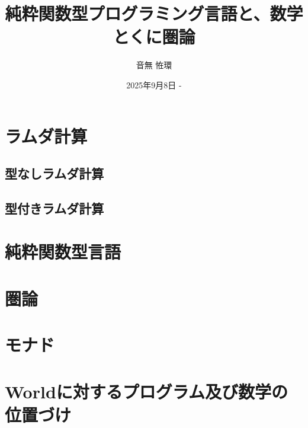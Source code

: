 \documentclass[uplatex,dvipdfmx,a4paper]{jsbook}
\title{純粋関数型プログラミング言語と、数学とくに圏論}
\author{音無 恠環}
\date{2025年9月8日 - }
\begin{document}
    \maketitle

    \chapter{ラムダ計算}
        \section{型なしラムダ計算}
        \section{型付きラムダ計算}

    \chapter{純粋関数型言語}

    \chapter{圏論}

    \chapter{モナド}

    \chapter{Worldに対するプログラム及び数学の位置づけ}
\end{document}
